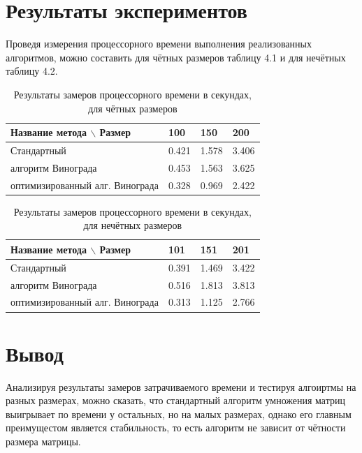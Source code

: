 \documentclass[12pt,a4paper]{report}
\begin{document}
\section{Результаты экспериментов}

Проведя измерения процессорного времени выполнения реализованных алгоритмов, можно составить для чётных размеров 
таблицу 4.1 и для нечётных таблицу 4.2.

\begin{table}[h]
\caption{Результаты замеров процессорного времени в секундах, для чётных размеров}
\label{tabular:timesandtenses}
\begin{center}
\begin{tabular}{ | l | l | l | l | }
\hline
    Название метода $\backslash$ Размер & 100   & 150   & 200   \\ \hline
    Стандартный                         & 0.421 & 1.578 & 3.406 \\ \hline
    алгоритм Винограда                  & 0.453 & 1.563 & 3.625 \\ \hline
    оптимизированный алг. Винограда     & 0.328 & 0.969 & 2.422 \\ \hline
\end{tabular}
\end{center}
\end{table}

\begin{table}[h]
\caption{Результаты замеров процессорного времени в секундах, для нечётных размеров}
\label{tabular:timesandtenses}
\begin{center}
\begin{tabular}{ | l | l | l | l | }
\hline
        Название метода $\backslash$ Размер & 101   & 151   & 201   \\ \hline
        Стандартный                         & 0.391 & 1.469 & 3.422 \\ \hline
        алгоритм Винограда                  & 0.516 & 1.813 & 3.813 \\ \hline
        оптимизированный алг. Винограда     & 0.313 & 1.125 & 2.766 \\ \hline
\end{tabular}
\end{center}
\end{table}

\section{Вывод}

Анализируя результаты замеров затрачиваемого времени и тестируя алгоиртмы на разных размерах, 
можно сказать, что стандартный алгоритм умножения матриц выигрывает по времени у остальных, но на малых 
размерах, однако его главным преимущестом является стабильность, то есть алгоритм не зависит от чётности 
размера матрицы. \\
\end{document}
